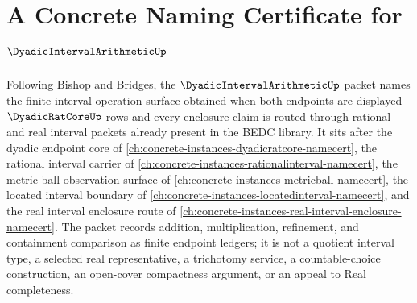 \chapter{A Concrete Naming Certificate for $\DyadicIntervalArithmeticUp$}
\label{ch:concrete-instances-dyadic-interval-arithmetic-namecert}

Following Bishop and Bridges, the $\DyadicIntervalArithmeticUp$ packet names the finite interval-operation surface obtained when both endpoints are displayed $\DyadicRatCoreUp$ rows and every enclosure claim is routed through rational and real interval packets already present in the BEDC library. It sits after the dyadic endpoint core of \autoref{ch:concrete-instances-dyadicratcore-namecert}, the rational interval carrier of \autoref{ch:concrete-instances-rationalinterval-namecert}, the metric-ball observation surface of \autoref{ch:concrete-instances-metricball-namecert}, the located interval boundary of \autoref{ch:concrete-instances-locatedinterval-namecert}, and the real interval enclosure route of \autoref{ch:concrete-instances-real-interval-enclosure-namecert}. The packet records addition, multiplication, refinement, and containment comparison as finite endpoint ledgers; it is not a quotient interval type, a selected real representative, a trichotomy service, a countable-choice construction, an open-cover compactness argument, or an appeal to Real completeness.


